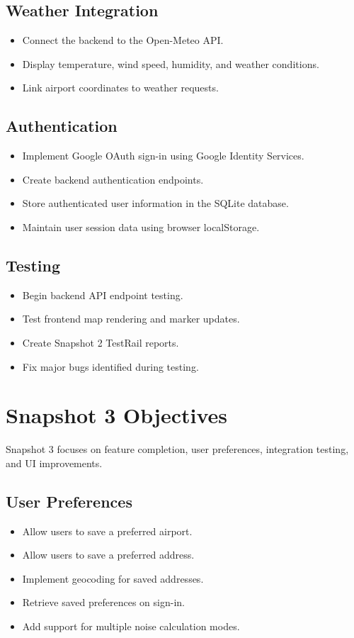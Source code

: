 \documentclass[12pt]{article}
\begin{document}
\subsection{Weather Integration}
\begin{itemize}
\item Connect the backend to the Open-Meteo API.
\item Display temperature, wind speed, humidity, and weather conditions.
\item Link airport coordinates to weather requests.
\end{itemize}

\subsection{Authentication}
\begin{itemize}
\item Implement Google OAuth sign-in using Google Identity Services.
\item Create backend authentication endpoints.
\item Store authenticated user information in the SQLite database.
\item Maintain user session data using browser localStorage.
\end{itemize}

\subsection{Testing}
\begin{itemize}
\item Begin backend API endpoint testing.
\item Test frontend map rendering and marker updates.
\item Create Snapshot 2 TestRail reports.
\item Fix major bugs identified during testing.
\end{itemize}

\newpage

\section{Snapshot 3 Objectives}

Snapshot 3 focuses on feature completion, user preferences, integration testing, and UI improvements.

\subsection{User Preferences}
\begin{itemize}
\item Allow users to save a preferred airport.
\item Allow users to save a preferred address.
\item Implement geocoding for saved addresses.
\item Retrieve saved preferences on sign-in.
\item Add support for multiple noise calculation modes.
\end{itemize}
\end{document}
